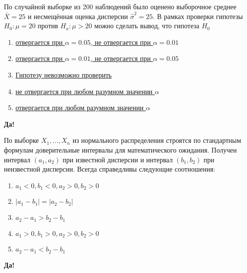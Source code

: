 \documentclass[t]{beamer}
\begin{document}
 \begin{frame} \label{15-Yes} 
\begin{block}{15} 

  По случайной выборке из 200 наблюдений было оценено выборочное среднее $\bar{X} = 25$  и несмещённая оценка дисперсии $\hat{\sigma}^2 = 25$. В рамках проверки гипотезы $H_0: \mu = 20$ против $H_a: \mu > 20$ можно сделать вывод, что гипотеза $H_0$
  


 \end{block} 
\begin{enumerate} 
\item[] \hyperlink{15-No}{\beamergotobutton{} отвергается при $\alpha = 0.05$, не отвергается при $\alpha = 0.01$}
\item[] \hyperlink{15-No}{\beamergotobutton{} отвергается при $\alpha = 0.01$, не отвергается при $\alpha = 0.05$}
\item[] \hyperlink{15-No}{\beamergotobutton{} Гипотезу невозможно проверить}
\item[] \hyperlink{15-No}{\beamergotobutton{} не отвергается при любом разумном значении $\alpha$}
\item[] \hyperlink{15-Yes}{\beamergotobutton{} отвергается при любом разумном значении $\alpha$}
\end{enumerate} 

 \textbf{Да!} 
 \hyperlink{16}{}\end{frame} 


 \begin{frame} \label{16-Yes} 
\begin{block}{16} 

   По выборке $X_1,\ldots, X_n$ из нормального распределения строятся по стандартным формулам доверительные интервалы для математического ожидания. Получен интервал $(a_1,a_2)$ при известной дисперсии и интервал $(b_1,b_2)$ при неизвестной дисперсии. Всегда справедливы следующие соотношения:
  


 \end{block} 
\begin{enumerate} 
\item[] \hyperlink{16-No}{\beamergotobutton{} $a_1<0,b_1<0,a_2>0,b_2>0$}
\item[] \hyperlink{16-Yes}{\beamergotobutton{} $|a_1-b_1| = |a_2-b_2|$}
\item[] \hyperlink{16-No}{\beamergotobutton{} $a_2 - a_1 > b_2 - b_1$}
\item[] \hyperlink{16-No}{\beamergotobutton{} $a_1>0,b_1>0,a_2>0,b_2>0$}
\item[] \hyperlink{16-No}{\beamergotobutton{} $a_2 - a_1 < b_2 - b_1$}
\end{enumerate} 

 \textbf{Да!} 
 \hyperlink{17}{}\end{frame} 
\end{document}

